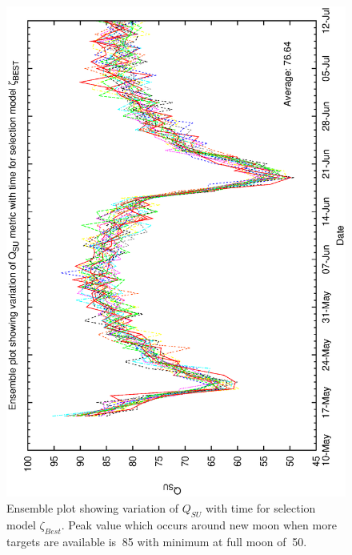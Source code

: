 \begin{figure}[h]
\begin{center}
   \includegraphics[scale=0.5, angle=-90]{figures/best_ensemble.eps}
   \caption[Ensemble plot showing variation of $Q_{SU}$ with time for selection model $\zeta_{Best}$.] 
   {Ensemble plot showing variation of $Q_{SU}$ with time for selection model $\zeta_{Best}$. Peak value which occurs around new moon when more targets are available is $~$85 with minimum at full moon of $~$50.}
   \label{fig:ensemble_best}
\end{center}
\end{figure}

